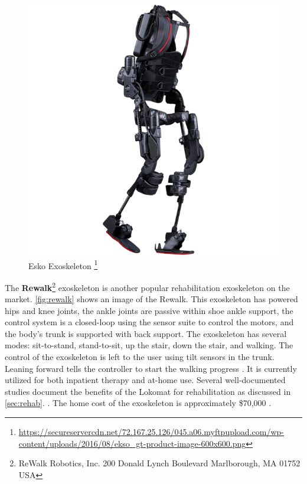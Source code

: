 \begin{figure}
    \centering
    \includegraphics[scale=0.38]{images/background/ekso.png}
    \caption[Esko Exoskeleton]{Esko Exoskeleton \protect\footnote{\url{https://secureservercdn.net/72.167.25.126/045.a06.myftpupload.com/wp-content/uploads/2016/08/ekso_gt-product-image-600x600.png}}}
    \label{fig:esko}
\end{figure}


The \textbf{Rewalk}\footnote{ReWalk Robotics, Inc.
200 Donald Lynch Boulevard Marlborough, MA 01752
USA} exoskeleton is another popular rehabilitation exoskeleton on the market. \autoref{fig:rewalk} shows an image of the Rewalk. This exoskeleton has powered hips and knee joints,  the ankle joints are passive within shoe ankle support,  the control system is a closed-loop using the sensor suite to control the motors, and the body's trunk is supported with back support. The exoskeleton has several modes: sit-to-stand, stand-to-sit, up the stair, down the stair, and walking. The control of the exoskeleton is left to the user using tilt sensors in the trunk. Leaning forward tells the controller to start the walking progress  \cite{zeilig2012safety}. It is currently utilized for both inpatient therapy and at-home use. Several well-documented studies document the benefits of the Lokomat for rehabilitation as discussed in \autoref{sec:rehab}. \cite{esquenazi2012rewalk}. The home cost of the exoskeleton is approximately \$70,000 \cite{wolff2014survey}. 


